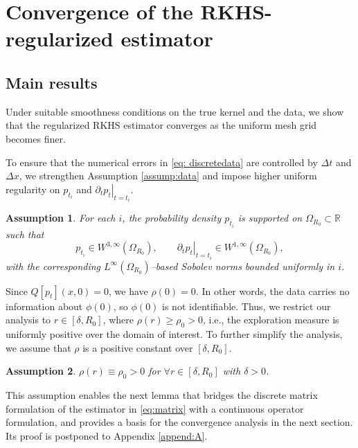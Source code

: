 \documentclass[12pt]{article}
\def\R{\mathbb{R}}
\numberwithin{equation}{section}
\numberwithin{theorem}{section}
\newtheorem{assumption}{Assumption}
\renewcommand{\theassumption}{H\arabic{assumption}} %
\begin{document}
\section{Convergence of the RKHS-regularized estimator}
\label{sec3}
\subsection{Main results}
Under suitable smoothness conditions on the true kernel and the data, we show that the regularized RKHS estimator converges as the uniform mesh grid becomes finer. 

To ensure that the numerical errors in \eqref{eq: discretedata} are controlled by $\Delta t$ and $\Delta x$, we strengthen Assumption \ref{assump:data} and impose higher uniform regularity on $p_{t_i}$ and $\left.\partial_t p_t\right|_{t=t_i}$.

{
\renewcommand{\theassumption}{H1$^\prime$}
\begin{assumption}\label{H:boundf}
For each $i$, the probability density $p_{t_i}$ is supported on $\Omega_{R_0}\subset \R$ such that
$$
p_{t_i}\in W^{3,\infty}(\Omega_{R_0}), \qquad \left.\partial_t p_t\right|_{t=t_i}\in W^{1,\infty}(\Omega_{R_0}),
$$
with the corresponding $L^\infty(\Omega_{R_0})$–based Sobolev norms bounded uniformly in $i$.  
\end{assumption}
}
\addtocounter{assumption}{-1}

Since $Q\left[p_t\right](x, 0)=0$, we have $\rho(0)=0$. In other words, the data carries no information about $\phi(0)$, so $\phi(0)$ is not identifiable. Thus, we restrict our analysis to $r \in\left[\delta, R_0\right]$, where $\rho(r) \geq \rho_0>0$, i.e., the exploration measure is uniformly positive over the domain of interest. To further simplify the analysis, we assume that $\rho$ is a positive constant over $[\delta, R_0]$.

\begin{assumption}{\label{H:constant}}  $\rho(r) \equiv \rho_0>0$ for $\forall r \in [\delta, R_0]$ with $\delta >0$.  
\end{assumption}
This assumption enables the next lemma that bridges the discrete matrix formulation of the estimator in \eqref{eq:matrix} with a continuous operator formulation, and provides a basis for the convergence analysis in the next section. Its proof is postponed to Appendix \ref{append:A}.
\end{document}
